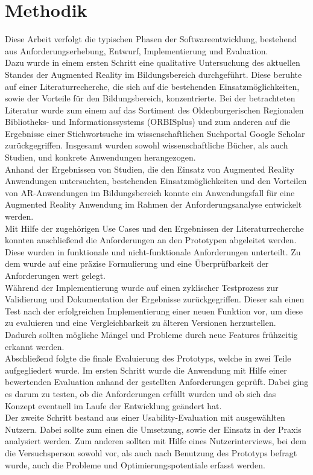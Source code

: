 \section{Methodik}
Diese Arbeit verfolgt die typischen Phasen der Softwareentwicklung, bestehend aus Anforderungserhebung, Entwurf, Implementierung und Evaluation.\\
Dazu wurde in einem ersten Schritt eine qualitative Untersuchung des aktuellen Standes der Augmented Reality im Bildungsbereich durchgeführt. 
Diese beruhte auf einer Literaturrecherche, die sich auf die bestehenden Einsatzmöglichkeiten, sowie der Vorteile für den Bildungsbereich, konzentrierte. Bei der betrachteten Literatur wurde zum einem auf das Sortiment des \glqq Oldenburgerischen Regionalen Bibliotheks- und Informationssystems (ORBISplus)\grqq{} und zum anderen auf die Ergebnisse einer Stichwortsuche im wissenschaftlichen Suchportal \glqq Google Scholar\grqq{} zurückgegriffen. 
Insgesamt wurden sowohl wissenschaftliche Bücher, als auch Studien, und konkrete Anwendungen herangezogen.\\
Anhand der Ergebnissen von Studien, die den Einsatz von Augmented Reality Anwendungen untersuchten, bestehenden Einsatzmöglichkeiten und den Vorteilen von AR-Anwendungen im Bildungsbereich konnte ein Anwendungsfall für eine Augmented Reality Anwendung im Rahmen der Anforderungsanalyse entwickelt werden.\\
Mit Hilfe der zugehörigen Use Cases und den Ergebnissen der Literaturrecherche konnten anschließend die Anforderungen an den Prototypen abgeleitet werden. Diese wurden in funktionale und nicht-funktionale Anforderungen unterteilt. Zu dem wurde auf eine präzise Formulierung und eine Überprüfbarkeit der Anforderungen wert gelegt.\\
Während der Implementierung wurde auf einen zyklischer Testprozess zur Validierung und Dokumentation der Ergebnisse zurückgegriffen. Dieser sah einen Test nach der erfolgreichen Implementierung einer neuen Funktion vor, um diese zu evaluieren und eine Vergleichbarkeit zu älteren Versionen herzustellen. Dadurch sollten mögliche Mängel und Probleme durch neue Features frühzeitig erkannt werden. \\
Abschließend folgte die finale Evaluierung des Prototyps, welche in zwei Teile aufgegliedert wurde. Im ersten Schritt wurde die Anwendung mit Hilfe einer bewertenden Evaluation anhand der gestellten Anforderungen geprüft. Dabei ging es darum zu testen, ob die Anforderungen erfüllt wurden und ob sich das Konzept eventuell im Laufe der Entwicklung geändert hat. \\
Der zweite Schritt bestand aus einer Usability-Evaluation mit ausgewählten Nutzern. Dabei sollte zum einen die Umsetzung, sowie der Einsatz in der Praxis analysiert werden. 
Zum anderen sollten mit Hilfe eines Nutzerinterviews, bei dem die Versuchsperson sowohl vor, als auch nach Benutzung des Prototyps befragt wurde, auch die Probleme und Optimierungspotentiale erfasst werden.

